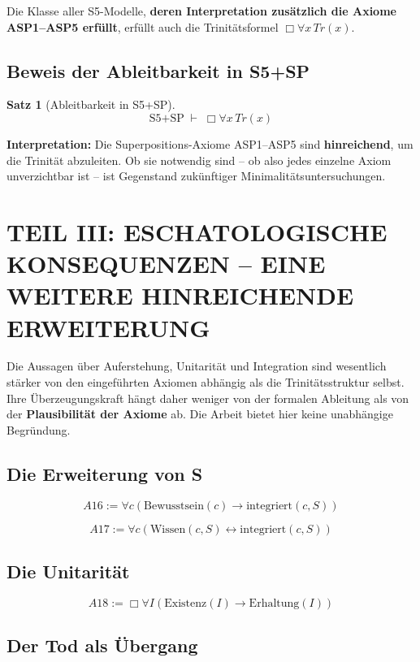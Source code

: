 \documentclass[
]{article}
\newtheorem{theorem}{Satz}
\begin{document}
Die Klasse aller S5-Modelle, \textbf{deren Interpretation zusätzlich die Axiome ASP1–ASP5 erfüllt}, erfüllt auch die Trinitätsformel \(\Box\forall x\,Tr(x)\).

\subsection{Beweis der Ableitbarkeit in S5+SP}

\begin{theorem}[Ableitbarkeit in S5+SP]
\[
\boxed{
\text{S5+SP} \;\vdash\; \Box\forall x\,Tr(x)
}
\]
\end{theorem}

\textbf{Interpretation:} Die Superpositions-Axiome ASP1–ASP5 sind \textbf{hinreichend}, um die Trinität abzuleiten. Ob sie notwendig sind – ob also jedes einzelne Axiom unverzichtbar ist – ist Gegenstand zukünftiger Minimalitätsuntersuchungen.

\section{TEIL III: ESCHATOLOGISCHE KONSEQUENZEN – EINE WEITERE HINREICHENDE ERWEITERUNG}

Die Aussagen über Auferstehung, Unitarität und Integration sind wesentlich stärker von den eingeführten Axiomen abhängig als die Trinitätsstruktur selbst. Ihre Überzeugungskraft hängt daher weniger von der formalen Ableitung als von der \textbf{Plausibilität der Axiome} ab. Die Arbeit bietet hier keine unabhängige Begründung.

\subsection{Die Erweiterung von S}

\[
\boxed{A16 := \forall c(\text{Bewusstsein}(c) \rightarrow \text{integriert}(c, S))}
\]

\[
\boxed{A17 := \forall c(\text{Wissen}(c, S) \leftrightarrow \text{integriert}(c, S))}
\]

\subsection{Die Unitarität}

\[
\boxed{A18 := \Box\forall I(\text{Existenz}(I) \rightarrow \text{Erhaltung}(I))}
\]

\subsection{Der Tod als Übergang}
\end{document}
